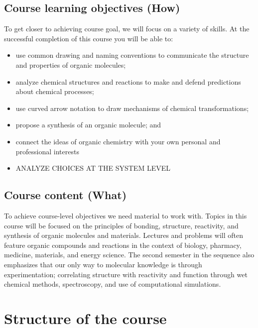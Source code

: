 \hypertarget{course-learning-objectives-how}{%
\subsection{Course learning objectives
(How)}\label{course-learning-objectives-how}}

To get closer to achieving course goal, we will focus on a variety of
skills. At the successful completion of this course you will be able to:

\begin{itemize}
\tightlist
\item
  use common drawing and naming conventions to communicate the structure
  and properties of organic molecules;
\item
  analyze chemical structures and reactions to make and defend
  predictions about chemical processes;
\item
  use curved arrow notation to draw mechanisms of chemical
  transformations;
\item
  propose a synthesis of an organic molecule; and
\item
  connect the ideas of organic chemistry with your own personal and
  professional interests
\item
  ANALYZE CHOICES AT THE SYSTEM LEVEL
\end{itemize}

\hypertarget{course-content-what}{%
\subsection{Course content (What)}\label{course-content-what}}

To achieve course-level objectives we need material to work with. Topics
in this course will be focused on the principles of bonding, structure,
reactivity, and synthesis of organic molecules and materials. Lectures
and problems will often feature organic compounds and reactions in the
context of biology, pharmacy, medicine, materials, and energy science.
The second semester in the sequence also emphasizes that our only way to
molecular knowledge is through experimentation; correlating structure
with reactivity and function through wet chemical methods, spectroscopy,
and use of computational simulations.

\hypertarget{structure-of-the-course}{%
\section{Structure of the course}\label{structure-of-the-course}}

